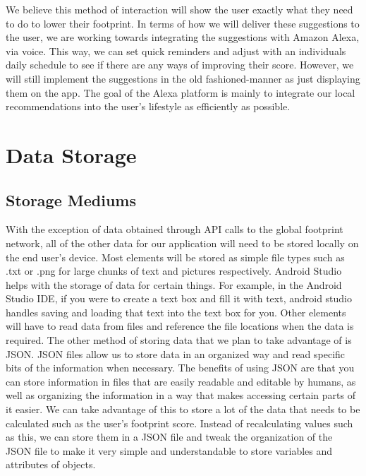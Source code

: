 \documentclass[onecolumn, draftclsnofoot,10pt, compsoc, tikz]{IEEEtran}
\begin{document}
We believe this method of interaction will show the user exactly what they need to do to lower their footprint. In terms of how we will deliver these suggestions to the user, we are working towards integrating the suggestions with Amazon Alexa, via voice. This way, we can set quick reminders and adjust with an individuals daily schedule to see if there are any ways of improving their score. However, we will still implement the suggestions in the old fashioned-manner as just displaying them on the app. The goal of the Alexa platform is mainly to integrate our local recommendations into the user’s lifestyle as efficiently as possible.  



\clearpage
\section{Data Storage}
\subsection{Storage Mediums}
With the exception of data obtained through API calls to the global footprint network, all of the other data for our application will need to be stored locally on the end user's device. Most elements will be stored as simple file types such as .txt or .png for large chunks of text and pictures respectively. Android Studio helps with the storage of data for certain things. For example, in the Android Studio IDE, if you were to create a text box and fill it with text, android studio handles saving and loading that text into the text box for you. Other elements will have to read data from files and reference the file locations when the data is required. The other method of storing data that we plan to take advantage of is JSON. JSON files allow us to store data in an organized way and read specific bits of the information when necessary. The benefits of using JSON are that you can store information in files that are easily readable and editable by humans, as well as organizing the information in a way that makes accessing certain parts of it easier. We can take advantage of this to store a lot of the data that needs to be calculated such as the user's footprint score. Instead of recalculating values such as this, we can store them in a JSON file and tweak the organization of the JSON file to make it very simple and understandable to store variables and attributes of objects.
\end{document}
